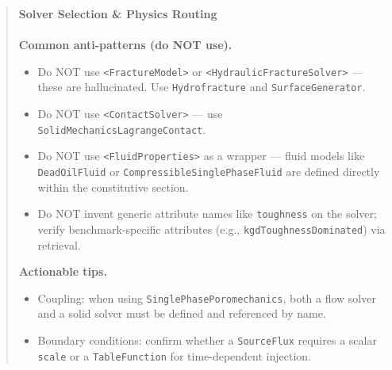 \documentclass{article}
\begin{document}
\begin{quote}\small
\textbf{Solver Selection \& Physics Routing}\\[2pt]
\noindent{}
\\[6pt]
\textbf{Common anti-patterns (do NOT use).}\\
\begin{itemize}
\item Do NOT use \texttt{<FractureModel>} or \texttt{<HydraulicFractureSolver>} --- these are hallucinated. Use \texttt{Hydrofracture} and \texttt{SurfaceGenerator}.
\item Do NOT use \texttt{<ContactSolver>} --- use \texttt{SolidMechanicsLagrangeContact}.
\item Do NOT use \texttt{<FluidProperties>} as a wrapper --- fluid models like \texttt{DeadOilFluid} or \texttt{CompressibleSinglePhaseFluid} are defined directly within the constitutive section.
\item Do NOT invent generic attribute names like \texttt{toughness} on the solver; verify benchmark-specific attributes (e.g., \texttt{kgdToughnessDominated}) via retrieval.
\end{itemize}
\textbf{Actionable tips.}\\
\begin{itemize}
\item Coupling: when using \texttt{SinglePhasePoromechanics}, both a flow solver and a solid solver must be defined and referenced by name.
\item Boundary conditions: confirm whether a \texttt{SourceFlux} requires a scalar \texttt{scale} or a \texttt{TableFunction} for time-dependent injection.
\end{itemize}
\end{quote}
\end{document}
